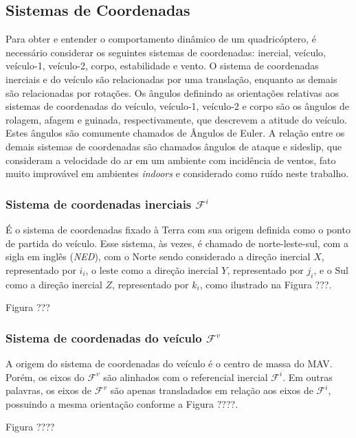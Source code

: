 \documentclass[a4paper, 12pt]{article}
\begin{document}
\subsection{Sistemas de Coordenadas}

Para obter e entender o comportamento dinâmico de um quadricóptero, é necessário considerar os seguintes sistemas de coordenadas: inercial, veículo, veículo-1, veículo-2, corpo, estabilidade e vento. O sistema de coordenadas inerciais e do veículo são relacionadas por uma translação, enquanto as demais são relacionadas por rotações. Os ângulos definindo as orientações relativas aos sistemas de coordenadas do veículo, veículo-1, veículo-2 e corpo são os ângulos de rolagem, afagem e guinada, respectivamente, que descrevem a atitude do veículo. Estes ângulos são comumente chamados de Ângulos de Euler. A relação entre os demais sistemas de coordenadas são chamados ângulos de ataque e sideslip, que consideram a velocidade do ar em um ambiente com incidência de ventos, fato muito improvável em ambientes \textit{indoors} e considerado como ruído neste trabalho. 

\subsubsection{Sistema de coordenadas inerciais $\mathcal{F}^i$}

É o sistema de coordenadas fixado à Terra com sua origem definida como o ponto de partida do veículo. Esse sistema, às vezes, é chamado de norte-leste-sul, com a sigla em inglês (\textit{NED}), com o Norte sendo considerado a direção inercial $X$, representado por $i_i$, o leste como a direção inercial $Y$, representado por $j_i$, e o Sul como a direção inercial $Z$, representado por $k_i$, como ilustrado na Figura ???. 

Figura ???

\subsubsection{Sistema de coordenadas do veículo $\mathcal{F}^v$}

A origem do sistema de coordenadas do veículo é o centro de massa do MAV. Porém, os eixos do $\mathcal{F}^v$ são alinhados com o referencial inercial $\mathcal{F}^i$. Em outras palavras, os eixos de $\mathcal{F}^v$ são apenas transladados em relação aos eixos de $\mathcal{F}^i$, possuindo a mesma orientação conforme a Figura ????.

Figura ????
\end{document}

